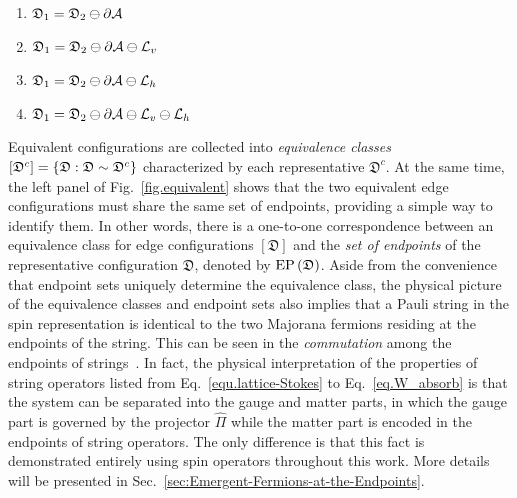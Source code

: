 \begin{enumerate}
    \item[(i)] $\mathfrak{D}_1=\mathfrak{D}_2\ominus\partial\mathcal{A}$
    \item[(ii)] $\mathfrak{D}_1=\mathfrak{D}_2\ominus\partial\mathcal{A}\ominus\mathcal{L}_v$
    \item[(iii)] $\mathfrak{D}_1=\mathfrak{D}_2\ominus\partial\mathcal{A}\ominus\mathcal{L}_h$
    \item[(iv)] $\mathfrak{D}_1=\mathfrak{D}_2\ominus\partial\mathcal{A}\ominus\mathcal{L}_v\ominus\mathcal{L}_h$
\end{enumerate} 
Equivalent configurations are collected into \emph{equivalence classes} $[\mathfrak{D}^c]=\left\{ \mathfrak{D}:\mathfrak{D}\sim\mathfrak{D}^c \right\}$ characterized by each representative $\mathfrak{D}^c$. At the same time, {the left panel} of Fig.~\ref{fig.equivalent} shows that the two equivalent edge configurations must share the same set of endpoints, providing a simple way to identify them. In other words, there is a one-to-one correspondence between an equivalence class for edge configurations $[\mathfrak{D}]$ and the \textit{set of endpoints} of the representative configuration $\mathfrak{D}$, denoted by $\mathrm{EP}\left( \mathfrak{D} \right)$. Aside from the convenience that endpoint sets uniquely determine the {equivalence class}, the physical picture of the equivalence classes and endpoint sets also implies that a Pauli string in the spin representation is identical to the two Majorana fermions residing at the endpoints of the string. This can be seen in the \textit{commutation} among the endpoints of strings~\cite{Kitaev_2006, Kawagoe-Levin_2020, fermion-and-string}. {In fact, the physical interpretation of the properties of string operators listed from Eq.~\eqref{equ.lattice-Stokes} to Eq.~\eqref{eq.W_absorb} is that the system can be separated into the gauge and matter parts, in which the gauge part is governed by the projector $\hat{\Pi}$ while the matter part is encoded in the endpoints of string operators. The only difference is that this fact is demonstrated entirely using spin operators throughout this work. More details will be presented in Sec.~\ref{sec:Emergent-Fermions-at-the-Endpoints}.} 

